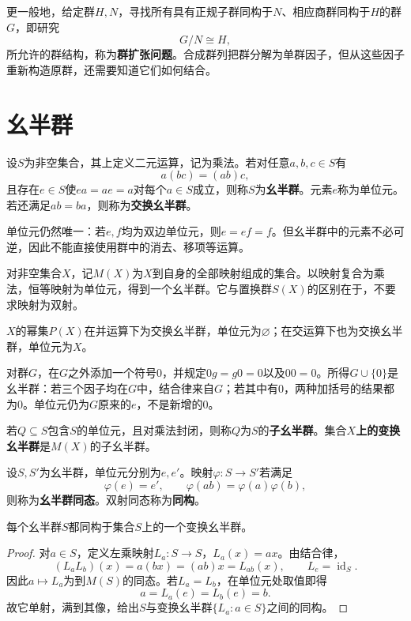 更一般地，给定群$H,N$，寻找所有具有正规子群同构于$N$、相应商群同构于$H$的群$G$，即研究
\[
G/N\cong H,
\]
所允许的群结构，称为\textbf{群扩张问题}。合成群列把群分解为单群因子，但从这些因子重新构造原群，还需要知道它们如何结合。

\section{幺半群}
\begin{definition}
设$S$为非空集合，其上定义二元运算，记为乘法。若对任意$a,b,c\in S$有
\[
a(bc)=(ab)c,
\]
且存在$e\in S$使$ea=ae=a$对每个$a\in S$成立，则称$S$为\textbf{幺半群}。元素$e$称为单位元。若还满足$ab=ba$，则称为\textbf{交换幺半群}。
\end{definition}

单位元仍然唯一：若$e,f$均为双边单位元，则$e=ef=f$。但幺半群中的元素不必可逆，因此不能直接使用群中的消去、移项等运算。
\begin{example}
对非空集合$X$，记$M(X)$为$X$到自身的全部映射组成的集合。以映射复合为乘法，恒等映射为单位元，得到一个幺半群。它与置换群$S(X)$的区别在于，不要求映射为双射。

$X$的幂集$P(X)$在并运算下为交换幺半群，单位元为$\varnothing$；在交运算下也为交换幺半群，单位元为$X$。
\end{example}

\begin{example}
对群$G$，在$G$之外添加一个符号0，并规定$0g=g0=0$以及$00=0$。所得$G\cup\{0\}$是幺半群：若三个因子均在$G$中，结合律来自$G$；若其中有0，两种加括号的结果都为0。单位元仍为$G$原来的$e$，不是新增的0。
\end{example}

\begin{definition}
若$Q\subseteq S$包含$S$的单位元，且对乘法封闭，则称$Q$为$S$的\textbf{子幺半群}。集合\textbf{$X$上的变换幺半群}是$M(X)$的子幺半群。

设$S,S'$为幺半群，单位元分别为$e,e'$。映射$\varphi:S\to S'$若满足
\[
\varphi(e)=e',\qquad\varphi(ab)=\varphi(a)\varphi(b),
\]
则称为\textbf{幺半群同态}。双射同态称为\textbf{同构}。
\end{definition}

\begin{theorem}
每个幺半群$S$都同构于集合$S$上的一个变换幺半群。
\end{theorem}
\begin{proof}
对$a\in S$，定义左乘映射$L_a:S\to S$，$L_a(x)=ax$。由结合律，
\[
(L_aL_b)(x)=a(bx)=(ab)x=L_{ab}(x),
\qquad L_e=\operatorname{id}_S.
\]
因此$a\mapsto L_a$为到$M(S)$的同态。若$L_a=L_b$，在单位元处取值即得
\[
a=L_a(e)=L_b(e)=b.
\]
故它单射，满到其像，给出$S$与变换幺半群$\{L_a:a\in S\}$之间的同构。
\end{proof}

